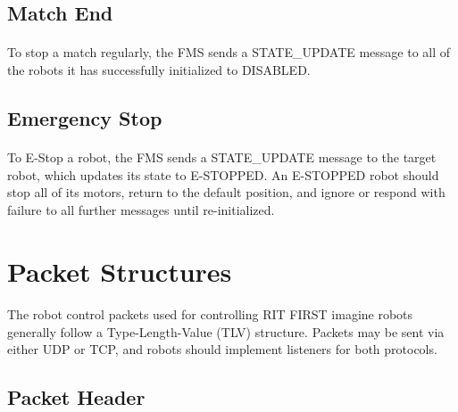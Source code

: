 \documentclass[11pt]{article}
\begin{document}
\subsection {Match End}
\paragraph{}
To stop a match regularly, the FMS sends a STATE\_UPDATE message to 
all of the robots it has successfully initialized to DISABLED.

\subsection{Emergency Stop}
\paragraph{}
To E-Stop a robot, the FMS sends a STATE\_UPDATE message to the target robot, which updates its state to E-STOPPED.
An E-STOPPED robot should stop all of its motors,
return to the default position, and ignore or respond with failure to all further messages until re-initialized.

\section {Packet Structures}
\paragraph{}
The robot control packets used for controlling RIT FIRST imagine robots generally follow a Type-Length-Value (TLV) structure.
Packets may be sent via either UDP or TCP, and robots should implement listeners for both protocols.

\subsection {Packet Header}
\end{document}
